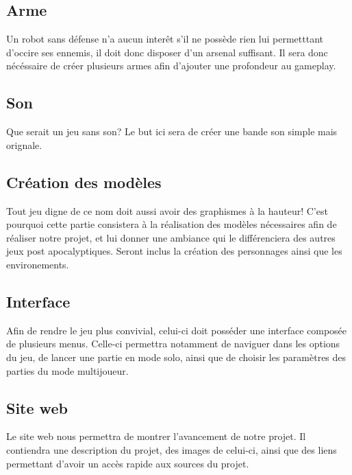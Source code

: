 ﻿\documentclass[12pt]{article}
\begin{document}
\subsection{Arme}
Un robot sans défense n’a aucun interêt s’il ne possède rien lui permetttant
d’occire ses ennemis, il doit donc disposer d’un arsenal suﬃsant. Il sera donc
nécéssaire de créer plusieurs armes aﬁn d’ajouter une profondeur au gameplay.

\subsection{Son}
Que serait un jeu sans son? Le but ici sera de créer une bande son simple mais orignale.

\subsection{Création des modèles}
Tout jeu digne de ce nom doit aussi avoir des graphismes à la hauteur! C’est pourquoi
cette partie consistera à la réalisation des modèles nécessaires aﬁn de réaliser
notre projet, et lui donner une ambiance qui le différenciera des autres jeux post
apocalyptiques. Seront inclus la création des personnages ainsi que les environements.

\subsection{Interface}
Aﬁn de rendre le jeu plus convivial, celui-ci doit posséder une interface composée
de plusieurs menus. Celle-ci permettra notamment de naviguer dans les options du jeu,
de lancer une partie en mode solo, ainsi que de choisir les paramètres des parties
du mode multijoueur.

\subsection{Site web}
Le site web nous permettra de montrer l’avancement de notre projet.
Il contiendra une description du projet, des images de celui-ci, ainsi que des
liens permettant d’avoir un accès rapide aux sources du projet.
\end{document}
